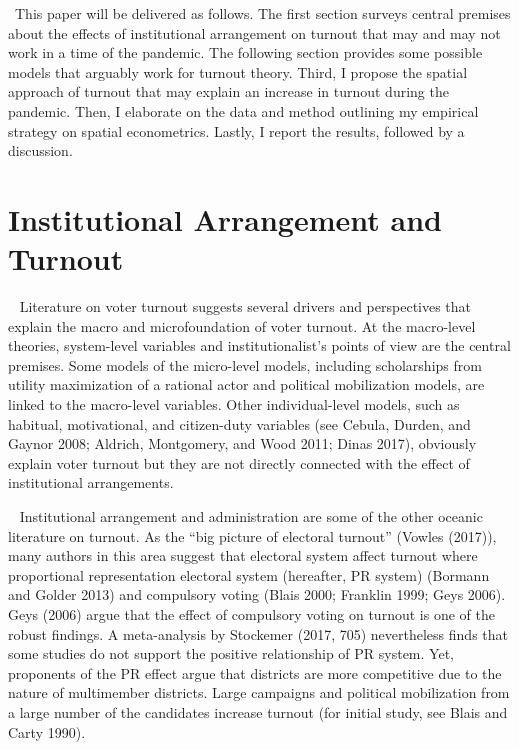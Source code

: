 \documentclass[
  12pt,
]{article}
\begin{document}
~This paper will be delivered as follows. The first section surveys
central premises about the effects of institutional arrangement on
turnout that may and may not work in a time of the pandemic. The
following section provides some possible models that arguably work for
turnout theory. Third, I propose the spatial approach of turnout that
may explain an increase in turnout during the pandemic. Then, I
elaborate on the data and method outlining my empirical strategy on
spatial econometrics. Lastly, I report the results, followed by a
discussion.

\hypertarget{institutional-arrangement-and-turnout}{%
\section{Institutional Arrangement and
Turnout}\label{institutional-arrangement-and-turnout}}

~ Literature on voter turnout suggests several drivers and perspectives
that explain the macro and microfoundation of voter turnout. At the
macro-level theories, system-level variables and institutionalist's
points of view are the central premises. Some models of the micro-level
models, including scholarships from utility maximization of a rational
actor and political mobilization models, are linked to the macro-level
variables. Other individual-level models, such as habitual,
motivational, and citizen-duty variables (see Cebula, Durden, and Gaynor
2008; Aldrich, Montgomery, and Wood 2011; Dinas 2017), obviously explain
voter turnout but they are not directly connected with the effect of
institutional arrangements.

~ Institutional arrangement and administration are some of the other
oceanic literature on turnout. As the ``big picture of electoral
turnout'' (Vowles (2017)), many authors in this area suggest that
electoral system affect turnout where proportional representation
electoral system (hereafter, PR system) (Bormann and Golder 2013) and
compulsory voting (Blais 2000; Franklin 1999; Geys 2006). Geys (2006)
argue that the effect of compulsory voting on turnout is one of the
robust findings. A meta-analysis by Stockemer (2017, 705) nevertheless
finds that some studies do not support the positive relationship of PR
system. Yet, proponents of the PR effect argue that districts are more
competitive due to the nature of multimember districts. Large campaigns
and political mobilization from a large number of the candidates
increase turnout (for initial study, see Blais and Carty 1990).
\end{document}
